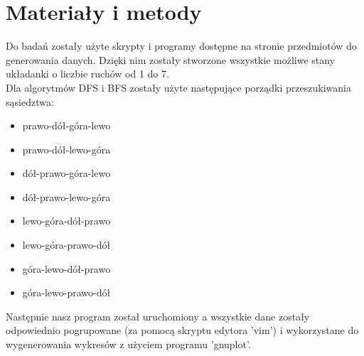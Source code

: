 \documentclass{classrep}
\begin{document}
    \section{Materiały i metody} {
        Do badań zostały użyte skrypty i programy dostępne na stronie przedmiotów do
        generowania danych. Dzięki nim zostały stworzone wszystkie możliwe stany
        układanki o liczbie ruchów od 1 do 7.\\
        Dla algorytmów DFS i BFS zostały użyte następujące porządki przeszukiwania sąsiedztwa:
        \begin{itemize}
            \item prawo-dół-góra-lewo
            \item prawo-dół-lewo-góra
            \item dół-prawo-góra-lewo
            \item dół-prawo-lewo-góra
            \item lewo-góra-dół-prawo
            \item lewo-góra-prawo-dół
            \item góra-lewo-dół-prawo
            \item góra-lewo-prawo-dół
        \end{itemize}
        \bigskip

        Następnie nasz program został uruchomiony a wszystkie dane zostały odpowiednio pogrupowane
        (za pomocą skryptu edytora 'vim') i wykorzystane do wygenerowania wykresów z użyciem
        programu 'gnuplot'.
    }
\end{document}
